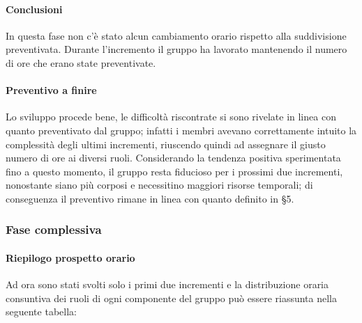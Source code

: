 		\paragraph{Conclusioni}
			In questa fase non c'è stato alcun cambiamento orario rispetto alla suddivisione preventivata.
			Durante l'incremento il gruppo ha lavorato mantenendo il numero di ore che erano state preventivate. 
		
		\paragraph{Preventivo a finire}
			Lo sviluppo procede bene, le difficoltà riscontrate si sono rivelate in linea con quanto preventivato dal gruppo; infatti i membri avevano correttamente intuito la complessità degli ultimi incrementi, riuscendo quindi ad assegnare il giusto numero di ore ai diversi ruoli.
			\newline
			Considerando la tendenza positiva sperimentata fino a questo momento, il gruppo resta fiducioso per i prossimi due incrementi, nonostante siano più corposi e necessitino maggiori risorse temporali; di conseguenza il preventivo rimane in linea con quanto definito in \S5.
		
		\subsubsection{Fase complessiva}
		
		\paragraph{Riepilogo prospetto orario}
			Ad ora sono stati svolti solo i primi due incrementi e la distribuzione oraria consuntiva dei ruoli di ogni componente del gruppo può essere riassunta nella seguente tabella:
			
